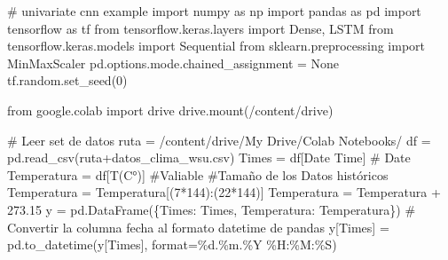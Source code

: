\documentclass[
  us-letterpaper,
]{scrreprt}
\newenvironment{Shaded}{\begin{snugshade}}{\end{snugshade}}
\newcommand{\BuiltInTok}[1]{\textcolor[rgb]{0.00,0.23,0.31}{#1}}
\newcommand{\CommentTok}[1]{\textcolor[rgb]{0.37,0.37,0.37}{#1}}
\newcommand{\DecValTok}[1]{\textcolor[rgb]{0.68,0.00,0.00}{#1}}
\newcommand{\FloatTok}[1]{\textcolor[rgb]{0.68,0.00,0.00}{#1}}
\newcommand{\ImportTok}[1]{\textcolor[rgb]{0.00,0.46,0.62}{#1}}
\newcommand{\NormalTok}[1]{\textcolor[rgb]{0.00,0.23,0.31}{#1}}
\newcommand{\OperatorTok}[1]{\textcolor[rgb]{0.37,0.37,0.37}{#1}}
\newcommand{\SpecialCharTok}[1]{\textcolor[rgb]{0.37,0.37,0.37}{#1}}
\newcommand{\StringTok}[1]{\textcolor[rgb]{0.13,0.47,0.30}{#1}}
\newcommand{\VariableTok}[1]{\textcolor[rgb]{0.07,0.07,0.07}{#1}}
\theoremstyle{plain}
\theoremstyle{definition}
\theoremstyle{definition}
\theoremstyle{remark}
\begin{document}
\begin{Shaded}
\begin{Highlighting}[]
\CommentTok{\# univariate cnn example}
\ImportTok{import}\NormalTok{ numpy }\ImportTok{as}\NormalTok{ np}
\ImportTok{import}\NormalTok{ pandas }\ImportTok{as}\NormalTok{ pd}
\ImportTok{import}\NormalTok{ tensorflow }\ImportTok{as}\NormalTok{ tf}
\ImportTok{from}\NormalTok{ tensorflow.keras.layers }\ImportTok{import}\NormalTok{ Dense, LSTM}
\ImportTok{from}\NormalTok{ tensorflow.keras.models }\ImportTok{import}\NormalTok{ Sequential}
\ImportTok{from}\NormalTok{ sklearn.preprocessing }\ImportTok{import}\NormalTok{ MinMaxScaler}
\NormalTok{pd.options.mode.chained\_assignment }\OperatorTok{=} \VariableTok{None}
\NormalTok{tf.random.set\_seed(}\DecValTok{0}\NormalTok{)}



\ImportTok{from}\NormalTok{ google.colab }\ImportTok{import}\NormalTok{ drive}
\NormalTok{drive.mount(}\StringTok{\textquotesingle{}/content/drive\textquotesingle{}}\NormalTok{)}

\CommentTok{\# Leer set de datos}
\NormalTok{ruta }\OperatorTok{=} \StringTok{\textquotesingle{}/content/drive/My Drive/Colab Notebooks/\textquotesingle{}}
\NormalTok{df }\OperatorTok{=}\NormalTok{ pd.read\_csv(ruta}\OperatorTok{+}\StringTok{\textquotesingle{}datos\_clima\_wsu.csv\textquotesingle{}}\NormalTok{)}
\NormalTok{Times }\OperatorTok{=}\NormalTok{ df[}\StringTok{\textquotesingle{}Date Time\textquotesingle{}}\NormalTok{] }\CommentTok{\# Date}
\NormalTok{Temperatura }\OperatorTok{=}\NormalTok{ df[}\StringTok{\textquotesingle{}T(C°)\textquotesingle{}}\NormalTok{] }\CommentTok{\#Valiable}
\CommentTok{\#Tamaño de los Datos históricos}
\NormalTok{Temperatura }\OperatorTok{=}\NormalTok{ Temperatura[(}\DecValTok{7}\OperatorTok{*}\DecValTok{144}\NormalTok{):(}\DecValTok{22}\OperatorTok{*}\DecValTok{144}\NormalTok{)] }
\NormalTok{Temperatura }\OperatorTok{=}\NormalTok{ Temperatura }\OperatorTok{+} \FloatTok{273.15} 
\NormalTok{y }\OperatorTok{=}\NormalTok{ pd.DataFrame(\{}\StringTok{\textquotesingle{}Times\textquotesingle{}}\NormalTok{: Times, }\StringTok{\textquotesingle{}Temperatura\textquotesingle{}}\NormalTok{: Temperatura\})}
\CommentTok{\# Convertir la columna \textquotesingle{}fecha\textquotesingle{} al formato datetime de pandas}
\NormalTok{y[}\StringTok{\textquotesingle{}Times\textquotesingle{}}\NormalTok{] }\OperatorTok{=}\NormalTok{ pd.to\_datetime(y[}\StringTok{\textquotesingle{}Times\textquotesingle{}}\NormalTok{], }\BuiltInTok{format}\OperatorTok{=}\StringTok{\textquotesingle{}}\SpecialCharTok{\%d}\StringTok{.\%m.\%Y \%H:\%M:\%S\textquotesingle{}}\NormalTok{)}


\end{Highlighting}
\end{Shaded}
\end{document}
